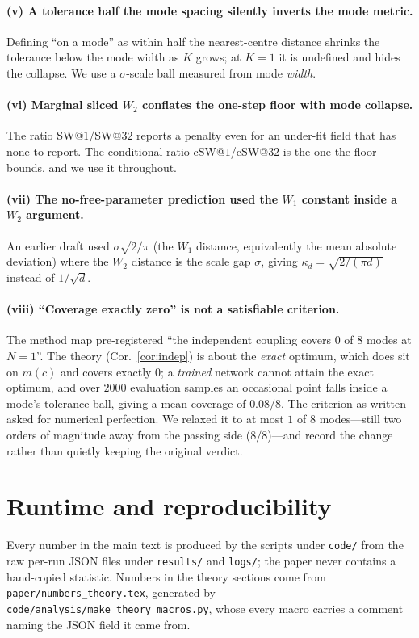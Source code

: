 \documentclass{article}
\theoremstyle{plain}
\begin{document}
\paragraph{(v) A tolerance half the mode spacing silently inverts the mode metric.}
Defining ``on a mode'' as within half the nearest-centre distance shrinks the
tolerance below the mode width as $K$ grows; at $K=1$ it is undefined and hides the
collapse. We use a $\sigma$-scale ball measured from mode \emph{width}.

\paragraph{(vi) Marginal sliced $W_2$ conflates the one-step floor with mode
collapse.} The ratio SW@$1$/SW@$32$ reports a penalty even for an under-fit field that
has none to report. The conditional ratio cSW@$1$/cSW@$32$ is the one the floor
bounds, and we use it throughout.

\paragraph{(vii) The no-free-parameter prediction used the $W_1$ constant inside a
$W_2$ argument.} An earlier draft used $\sigma\sqrt{2/\pi}$ (the $W_1$ distance,
equivalently the mean absolute deviation) where the $W_2$ distance is the scale gap
$\sigma$, giving $\kappa_d=\sqrt{2/(\pi d)}$ instead of $1/\sqrt d$.

\paragraph{(viii) ``Coverage exactly zero'' is not a satisfiable criterion.}
The method map pre-registered ``the independent coupling covers $0$ of $8$ modes at
$N=1$''. The theory (Cor.~\ref{cor:indep}) is about the \emph{exact} optimum, which does
sit on $m(c)$ and covers exactly $0$; a \emph{trained} network cannot attain the exact
optimum, and over $2000$ evaluation samples an occasional point falls inside a mode's
tolerance ball, giving a mean coverage of $0.08/8$. The criterion as written asked for
numerical perfection. We relaxed it to at most $1$ of $8$ modes---still two orders of
magnitude away from the passing side ($8/8$)---and record the change rather than
quietly keeping the original verdict.

\section{Runtime and reproducibility}
\label{app:runtime}
Every number in the main text is produced by the scripts under \texttt{code/} from the
raw per-run JSON files under \texttt{results/} and \texttt{logs/}; the paper never
contains a hand-copied statistic. Numbers in the theory sections come from
\texttt{paper/numbers\_theory.tex}, generated by
\texttt{code/analysis/make\_theory\_macros.py}, whose every macro carries a comment
naming the JSON field it came from.
\end{document}
